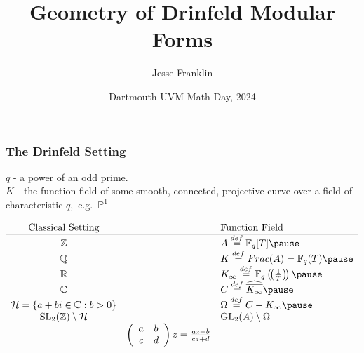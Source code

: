 \documentclass{beamer}
\title{Geometry of Drinfeld Modular Forms}
\author{Jesse Franklin}
\institute{University of Vermont}
\date{Dartmouth-UVM Math Day, 2024}
\numberwithin{equation}{section}
\numberwithin{case}{theorem}
\newcommand{\cH}{\mathcal{H}}		%
\newcommand{\bbC}{\mathbb{C}}		%
\newcommand{\bbF}{\mathbb{F}}		%
\newcommand{\bbP}{\mathbb{P}}		%
\newcommand{\bbQ}{\mathbb{Q}}		%
\newcommand{\bbR}{\mathbb{R}}		%
\newcommand{\bbZ}{\mathbb{Z}}		%
\newcommand{\GL}{\mathrm{GL}} 	%
\newcommand{\SL}{\mathrm{SL}} 	%
\newcommand{\<}{\left\langle}
\renewcommand{\>}{\right\rangle}
\begin{document}
	
\frame{\titlepage}

\begin{frame}
	\frametitle{The Drinfeld Setting}
	$q$ - a power of an odd prime.\\ 
	$K$ - the function field of some smooth, connected, projective curve over a field of characteristic $q,$ \pause  e.g.\ $\bbP^1$
	
	\[\begin{array}{ccl}
		\text{Classical Setting} && \text{Function Field}\\
		\hline
		\bbZ && A\overset{def}{=}\bbF_q[T]\pause\\
		\bbQ && K \overset{def}{=} Frac(A) = \bbF_q(T)\pause\\
		\bbR && K_{\infty}\overset{def}{=}\bbF_q\left(\!\left(\frac{1}{T}\right)\!\right) \pause\\
		\bbC && C \overset{def}{=} \widehat{\overline{K_{\infty}}}\pause\\
		\cH = \{a+bi\in \bbC:b>0\} && \Omega \overset{def}{=} C-K_{\infty}\pause\\
		\SL_2(\bbZ)\setminus\cH && \GL_2(A)\setminus \Omega\\
		&\left(\begin{array}{cc}a&b\\c&d\end{array}\right)z=\frac{az+b}{cz+d}&
		\end{array}\]
\end{frame}
\end{document}
